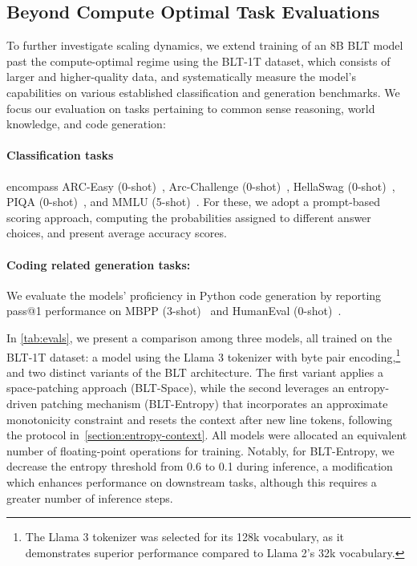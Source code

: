 \subsection{Beyond Compute Optimal Task Evaluations}
\label{section:evals}
To further investigate scaling dynamics, we extend training of an 8B {\textsc BLT} model past the compute-optimal regime using the {\textsc BLT}-1T dataset, which consists of larger and higher-quality data, and systematically measure the model’s capabilities on various established classification and generation benchmarks. We focus our evaluation on tasks pertaining to common sense reasoning, world knowledge, and code generation:
\paragraph{Classification tasks} encompass ARC-Easy (0-shot)~\citep{Eval_ARC}, Arc-Challenge (0-shot)~\citep{Eval_ARC}, HellaSwag (0-shot)~\citep{Eval_hellaswag}, PIQA (0-shot)~\citep{Eval_piqa}, and MMLU (5-shot)~\citep{hendrycks2020measuring}. For these, we adopt a prompt-based scoring approach, computing the probabilities assigned to different answer choices, and present average accuracy scores.
\paragraph{Coding related generation tasks:} We evaluate the models’ proficiency in Python code generation by reporting pass@1 performance on MBPP (3-shot)~\citep{Eval_MBPP} and HumanEval (0-shot)~\citep{Eval_HumanEval}.

In \autoref{tab:evals}, we present a comparison among three models, all trained on the {\textsc BLT}-1T dataset: a model using the Llama 3 tokenizer with byte pair encoding,\footnote{The Llama 3 tokenizer was selected for its 128k vocabulary, as it demonstrates superior performance compared to Llama 2's 32k vocabulary.} and two distinct variants of the {\textsc BLT} architecture. The first variant applies a space-patching approach ({\textsc BLT}-Space), while the second leverages an entropy-driven patching mechanism ({\textsc BLT}-Entropy) that incorporates an approximate monotonicity constraint and resets the context after new line tokens, following the protocol in~\autoref{section:entropy-context}. All models were allocated an equivalent number of floating-point operations for training. Notably, for {\textsc BLT}-Entropy, we decrease the entropy threshold from 0.6 to 0.1 during inference, a modification which enhances performance on downstream tasks, although this requires a greater number of inference steps.

